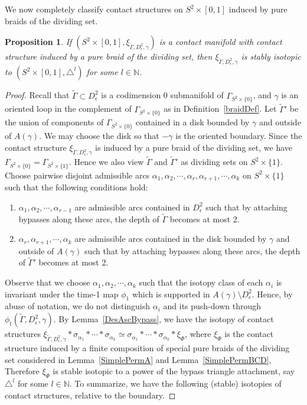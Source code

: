 \documentclass[12pt]{amsart}
\newtheorem{prop}[thm]{Proposition}
\theoremstyle{remark}
\newcommand{\be}{\begin{enumerate}}
\newcommand{\ee}{\end{enumerate}}
\begin{document}
We now completely classify contact structures on $S^2\times[0,1]$ induced by pure braids of the dividing set.

\begin{prop} \label{PermEquToBTs}
If $(S^2\times[0,1],\xi_{\tilde\Gamma,D^2_\epsilon,\gamma})$ is a contact manifold with contact structure induced by a pure braid of the dividing set, then $\xi_{\tilde\Gamma,D^2_\epsilon,\gamma}$ is stably isotopic to $(S^2\times[0,1],\triangle^{l})$ for some $l\in\mathbb{N}$.
\end{prop}

\begin{proof}
Recall that $\tilde\Gamma\subset D^2_\epsilon$ is a codimension 0 submanifold of $\Gamma_{S^2\times\{0\}}$, and $\gamma$ is an oriented loop in the complement of $\Gamma_{S^2\times\{0\}}$ as in Definition~\ref{braidDef}. Let $\tilde\Gamma'$ be the union of components of $\Gamma_{S^2\times\{0\}}$ contained in a disk bounded by $\gamma$ and outside of $A(\gamma)$. We may choose the disk so that $-\gamma$ is the oriented boundary. Since the contact structure $\xi_{\tilde\Gamma,D^2_\epsilon,\gamma}$ is induced by a pure braid of the dividing set, we have $\Gamma_{S^2\times\{0\}}=\Gamma_{S^2\times\{1\}}$. Hence we also view $\tilde\Gamma$ and $\tilde\Gamma'$ as dividing sets on $S^2\times\{1\}$. Choose pairwise disjoint admissible arcs $\alpha_1,\alpha_2,\cdots,\alpha_r,\alpha_{r+1},\cdots,\alpha_k$ on $S^2\times\{1\}$ such that the following conditions hold:

\be
\item{$\alpha_1,\alpha_2,\cdots,\alpha_{r-1}$ are admissible arcs contained in $D^2_\epsilon$ such that by attaching bypasses along these arcs, the depth of $\tilde\Gamma$ becomes at most 2.}
\item{$\alpha_r,\alpha_{r+1},\cdots,\alpha_k$ are admissible arcs contained in the disk bounded by $\gamma$ and outside of $A(\gamma)$ such that by attaching bypasses along these arcs, the depth of $\tilde\Gamma'$ becomes at most 2.}
\ee

Observe that we choose $\alpha_1,\alpha_2,\cdots,\alpha_k$ such that the isotopy class of each $\alpha_i$ is invariant under the time-1 map $\phi_1$ which is supported in $A(\gamma) \setminus D^2_\epsilon$. Hence, by abuse of notation, we do not distinguish $\alpha_i$ and its push-down through $\phi_t(\tilde\Gamma,D^2_\epsilon,\gamma)$. By Lemma~\ref{DesAscBypass},  we have the isotopy of contact structures $\xi_{\tilde\Gamma,D^2_\epsilon,\gamma}\ast\sigma_{\alpha_1}\ast\cdots\ast\sigma_{\alpha_k} \simeq \sigma_{\alpha_1}\ast\cdots\ast\sigma_{\alpha_k}\ast\xi_\Phi$, where $\xi_\Phi$ is the contact structure induced by a finite composition of special pure braids of the dividing set considered in Lemma~\ref{SimplePermA} and Lemma~\ref{SimplePermBCD}, Therefore $\xi_\Phi$ is stable isotopic to a power of the bypass triangle attachment, say $\triangle^l$ for some $l\in\mathbb{N}$. To summarize, we have the following (stable) isotopies of contact structures, relative to the boundary.


\end{proof}
\end{document}

